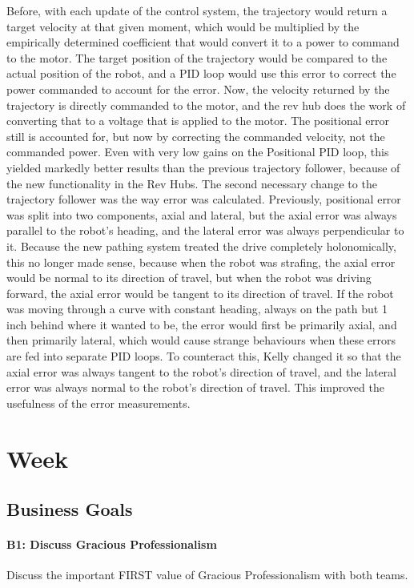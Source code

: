 \documentclass{article}
\begin{document}
Before, with each update of the control system, the trajectory would return a target velocity at that given moment, which would be multiplied by the empirically determined coefficient that would convert it to a power to command to the motor. The target position of the trajectory would be compared to the actual position of the robot, and a PID loop would use this error to correct the power commanded to account for the error. Now, the velocity returned by the trajectory is directly commanded to the motor, and the rev hub does the work of converting that to a voltage that is applied to the motor. The positional error still is accounted for, but now by correcting the commanded velocity, not the commanded power. Even with very low gains on the Positional PID loop, this yielded markedly better results than the previous trajectory follower, because of the new functionality in the Rev Hubs. The second necessary change to the trajectory follower was the way error was calculated. Previously, positional error was split into two components, axial and lateral, but the axial error was always parallel to the robot's heading, and the lateral error was always perpendicular to it. Because the new pathing system treated the drive completely holonomically, this no longer made sense, because when the robot was strafing, the axial error would be normal to its direction of travel, but when the robot was driving forward, the axial error would be tangent to its direction of travel. If the robot was moving through a curve with constant heading, always on the path but 1 inch behind where it wanted to be, the error would first be primarily axial, and then primarily lateral, which would cause strange behaviours when these errors are fed into separate PID loops. To counteract this, Kelly changed it so that the axial error was always tangent to the robot's direction of travel, and the lateral error was always normal to the robot's direction of travel. This improved the usefulness of the error measurements.
\clearpage \newpage \section{Week \thesection} 
\subsection{Business Goals}
\paragraph{B1: Discuss Gracious Professionalism}
 Discuss the important FIRST value of Gracious Professionalism with both teams.
\end{document}
